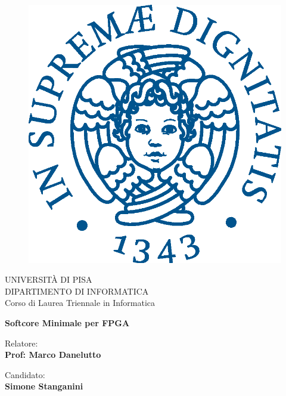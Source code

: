 \begin{titlepage}
\begin{figure}[!htb]
    \centering
    \includegraphics[keepaspectratio=true,scale=0.5]{images/Frontespizio/cherubinFrontespizio.eps}
\end{figure}

\begin{center}
    \LARGE{UNIVERSITÀ DI PISA}
    \vspace{5mm}
    \\ \large{DIPARTIMENTO DI INFORMATICA}
    \vspace{5mm}
    \\ \LARGE{Corso di Laurea Triennale in Informatica}
\end{center}

\vspace{15mm}
\begin{center}
    {\LARGE{\bf Softcore Minimale per FPGA }}
 
\end{center}
\vspace{30mm}

\begin{minipage}[t]{0.47\textwidth}
	{\large{Relatore:}{\normalsize\vspace{3mm}
	\bf\\ \large{Prof: Marco Danelutto} }}
\end{minipage}
\hfill
\begin{minipage}[t]{0.47\textwidth}\raggedleft
	{\large{Candidato:}{\normalsize\vspace{3mm} \bf\\ \large{Simone Stanganini}}}
\end{minipage}

\vspace{30mm}
\hrulefill
\\

\end{titlepage}